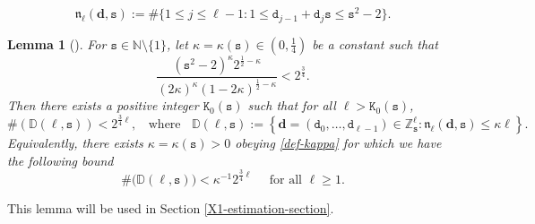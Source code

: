 \documentclass[12pt, twoside]{article}
\newtheorem{lemma}[theorem]{Lemma}
\theoremstyle{definition}
\numberwithin{equation}{section}
\begin{document}
\begin{equation} \label{def-nl}
\mathfrak n_{\ell}(\mathbf d, \mathtt s) := \# \{ 1 \leq j \leq \ell-1 : 1 \leq \mathtt d_{j-1} + \mathtt d_j \mathtt s \leq \mathtt s^2-2 \}. 
\end{equation} 
\begin{lemma}[{\cite[Lemma 3]{s60}}] \label{Schmidt-lemma-extremal-digits}
For $\mathtt s \in \mathbb N \setminus \{1\}$, let $\kappa = \kappa(\mathtt s) \in (0, \frac{1}{4})$ be a constant such that 
\begin{equation} \label{def-kappa}
\frac{(\mathtt s^2-2)^{\kappa} 2^{\frac{1}{2} - \kappa}}{(2 \kappa)^{\kappa} (1 - 2\kappa)^{\frac{1}{2} - \kappa}} < 2^{\frac{3}{4}}.
\end{equation} 
Then there exists a positive integer $\mathtt K_0(\mathtt s) $ such that for all $\ell > \mathtt K_0(\mathtt s)$,
\begin{equation} \label{extremal-digit-bounds} 
\#\left(\mathbb D(\ell, \mathtt s) \right)  < 2^{\frac{3}{4}\ell}, \; \; \text{ where } \; \; \mathbb D ( \ell, \mathtt s ) :=  \left\{\mathbf d = (\mathtt d_0, \ldots, \mathtt d_{\ell-1}) \in \mathbb Z_{\mathtt s}^{\ell} : \mathfrak n_{\ell}(\mathbf d, \mathtt s) \leq \kappa \ell \right\}. 
\end{equation} \label{extremal-digit-bounds-modified} 
Equivalently, there exists $\kappa = \kappa(\mathtt s) > 0$ obeying \eqref{def-kappa} for which we have the following bound
\begin{equation} \label{choice-of-kappa-2}
\#\bigl(\mathbb D(\ell, \mathtt s) \bigr)  < \kappa^{-1} 2^{\frac{3}{4}\ell} \quad \text{ for all } \ell \geq 1.  
\end{equation} 
\end{lemma}  
\noindent This lemma will be used in Section \ref{X1-estimation-section}. 
\end{document}
